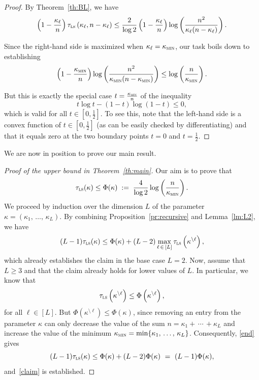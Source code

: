 \documentclass[10pt]{amsart}
\theoremstyle{definition}\newtheorem{defi}[theo]{Definition}\newtheorem{rema}[theo]{Remark}\newtheorem{exam}[theo]{Example}\newtheorem{exem}[theo]{Example}\newtheorem{nota}[theo]{Notation}
\newcommand{\tls}{\tau_{\textsc{ls}}}
\newcommand{\am}{{\kappa_{\textsc{min}}}}
\begin{document}
\begin{proof}
By Theorem~\ref{th:BL}, we have
\[
\left(1-\frac{\kappa_\ell}{n}\right)\tls\left(\kappa_\ell,n-\kappa_\ell\right) \le \frac{2}{\log 2}\left(1-\frac{\kappa_\ell}{n}\right)\log\left(\frac{n^2}{\kappa_\ell(n-\kappa_\ell)}\right).
\]

Since the right-hand side is maximized when $\kappa_\ell=\am$, our task boils down to establishing
\[
\left(1-\frac{\am}{n}\right)\log\left(\frac{n^2}{\am(n-\am)}\right) \le \log\left(\frac{n}{\am}\right).
\]

But this is exactly the special case $t=\tfrac{\am}{n}$ of the inequality
\[
t\log t-(1-t)\log\left(1-t\right) \le 0,
\]
which is valid for all $t\in[0,\frac 12]$. To see this, note that the left-hand side is a convex function of $t\in[0,\frac 12]$ (as can be easily checked by differentiating) and that it equals zero at the two boundary points $t=0$ and $t=\frac 12$.
\end{proof}

We are now in position to prove our main result.

\begin{proof}[Proof of the upper bound in Theorem~\ref{th:main}]Our aim is to prove that
\begin{equation}\label{claim}
\tls(\kappa) \le \Phi(\kappa) \; := \; \frac{4}{\log 2}\log\left(\frac{n}{\am}\right).
\end{equation}
We proceed by induction over the dimension $L$ of the parameter $\kappa=(\kappa_1,\,\ldots,\,\kappa_L)$. By combining Proposition~\ref{pr:recursive} and Lemma~\ref{lm:L2}, we have
\begin{equation}\label{end}
(L-1)\tls(\kappa) \le \Phi(\kappa)+(L-2)\max_{\ell\,\in\,[L]}\tls\left(\kappa^{\setminus\ell}\right),
\end{equation}
which already establishes the claim in the base case $L=2$. Now, assume that $L\ge 3$ and that the claim already holds for lower values of $L$. In particular, we know that
\[
\tls\left(\kappa^{\setminus \ell}\right) \le \Phi\left(\kappa^{\setminus \ell}\right),
\]
for all $\ell\in[L]$. But $\Phi(\kappa^{\setminus\ell})\le \Phi(\kappa)$, since removing an entry from the parameter $\kappa$ can only decrease the value of the sum $n=\kappa_1+\,\cdots\,+\kappa_L$ and increase the value of the minimum $\am=\min\{\kappa_1,\,\ldots,\,\kappa_L\}$. Consequently, \eqref{end} gives
\[
(L-1)\tls(\kappa) \le \Phi(\kappa)+(L-2)\Phi(\kappa)\ =\ (L-1)\Phi(\kappa),
\]
and~\eqref{claim} is established.
\end{proof}
\end{document}
